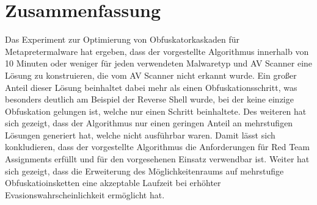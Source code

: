 \section{Zusammenfassung}
Das Experiment zur Optimierung von Obfuskatorkaskaden für Metapretermalware hat ergeben, dass der vorgestellte Algorithmus innerhalb von 10 Minuten oder weniger für jeden verwendeten Malwaretyp und AV Scanner eine Lösung zu konstruieren, die vom AV Scanner nicht erkannt wurde. Ein großer Anteil dieser Lösung beinhaltet dabei mehr als einen Obfuskationsschritt, was besonders deutlich am Beispiel der Reverse Shell wurde, bei der keine einzige Obfuskation gelungen ist, welche nur einen Schritt beinhaltete. Des weiteren hat sich gezeigt, dass der Algorithmus nur einen geringen Anteil an mehrstufigen Lösungen generiert hat, welche nicht ausführbar waren. Damit lässt sich konkludieren, dass der vorgestellte Algorithmus die Anforderungen für Red Team Assignments erfüllt und für den vorgesehenen Einsatz verwendbar ist. Weiter hat sich gezeigt, dass die Erweiterung des Möglichkeitenraums auf mehrstufige Obfuskatioinsketten eine akzeptable Laufzeit bei erhöhter Evasionswahrscheinlichkeit ermöglicht hat.
